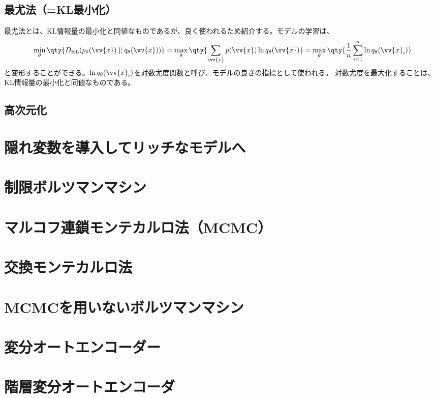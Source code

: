 \documentclass[a4paper,11pt,uplatex]{jsarticle}%
\begin{document}
\subsection{最尤法（=KL最小化）}
最尤法とは、KL情報量の最小化と同値なものであるが、良く使われるため紹介する。モデルの学習は、
\begin{equation}
  \min_{\theta}\qty{D_{\text{KL}}(p_0(\vv{x})\parallel q_{\theta}(\vv{x}))} 
  = \max_{\theta}\qty{\sum_{\vv{x}}p(\vv{x})\ln{q_{\theta}(\vv{x})}} 
  = \max_{\theta}\qty{\frac{1}{n}\sum_{i=1}^n\ln{q_{\theta}(\vv{x}_i)}}
\end{equation}
と変形することができる。$\ln{q_{\theta}(\vv{x}_i)}$を対数尤度関数と呼び、モデルの良さの指標として使われる。
対数尤度を最大化することは、KL情報量の最小化と同値なものである。
\subsection{高次元化}

\section{隠れ変数を導入してリッチなモデルへ}

\section{制限ボルツマンマシン}

\section{マルコフ連鎖モンテカルロ法（MCMC）}

\section{交換モンテカルロ法}

\section{MCMCを用いないボルツマンマシン}

\section{変分オートエンコーダー}

\section{階層変分オートエンコーダ}
\end{document}
